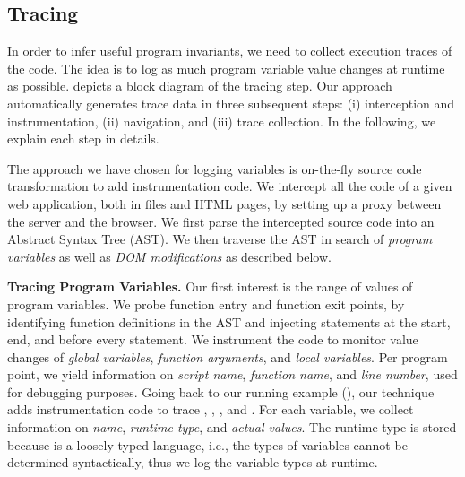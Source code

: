\subsection{\javascript Tracing}
In order to infer useful program invariants, we need to collect execution traces of the \javascript code. The idea is to log as much program variable value changes at runtime as possible.   depicts a block diagram of the tracing step. Our approach automatically generates trace data in three subsequent steps: 
(i) \javascript interception and instrumentation, (ii) navigation, and (iii) trace collection. In the following, we explain each step in details. 

 The approach we have chosen for logging variables is on-the-fly \javascript source code transformation to add instrumentation code.
We intercept all the \javascript code of a given web application, both in \javascript files and HTML pages, by setting up a proxy \cite{bezemer:esec09} between the server and the browser. We first parse the intercepted source code into an Abstract Syntax Tree (AST). 
We then traverse the AST in search of \emph{program variables} as well as \emph{DOM modifications} as described below.

{\bf Tracing Program Variables.} Our first interest is the range of values of \javascript program variables. We probe function entry and function exit points, by identifying function definitions in the AST and injecting statements at the start, end, and before every  statement. We instrument the code to monitor value changes of \emph{global variables}, \emph{function arguments}, and \emph{local variables}. 
Per program point, we yield information on \emph{script name}, \emph{function name}, and \emph{line number}, used for debugging purposes. Going back to our running example (), our technique adds instrumentation code to trace , , , and . For each variable, we collect information on \emph{name}, \emph{runtime type}, and \emph{actual values}. The runtime type is stored because \javascript is a loosely typed language, i.e., the types of variables cannot be determined syntactically, thus we log the variable types at runtime.

